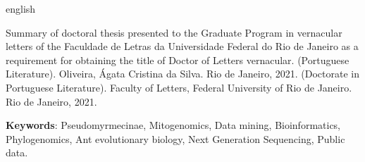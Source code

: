 \documentclass[
	12pt,				%
	oneside,
	a4paper,			%
	english,			%
	spanish,			%
	brazil				%
	]{abntex2}
\newcommand{\listofquadrosname}{Lista de quadros}
\begin{document}
\begin{resumo}[Abstract]
 \begin{otherlanguage*}{english}
   
   Summary of doctoral thesis presented to the Graduate Program in vernacular letters of the Faculdade de Letras da Universidade Federal do Rio de Janeiro as a requirement for obtaining the title of Doctor of Letters vernacular. (Portuguese Literature). 
   Oliveira, Ágata Cristina da Silva.  Rio de Janeiro, 2021. (Doctorate in Portuguese Literature). Faculty of Letters, Federal University of Rio de Janeiro. Rio de Janeiro, 2021.
   
   \vspace{\onelineskip}
 
   \noindent 
   \textbf{Keywords}: Pseudomyrmecinae, Mitogenomics, Data mining, Bioinformatics, Phylogenomics, Ant evolutionary biology, Next Generation Sequencing, Public data. 
 \end{otherlanguage*}
\end{resumo}

% 

  

\listoffigures*
\cleardoublepage


\listoftables*
\cleardoublepage
\end{document}
